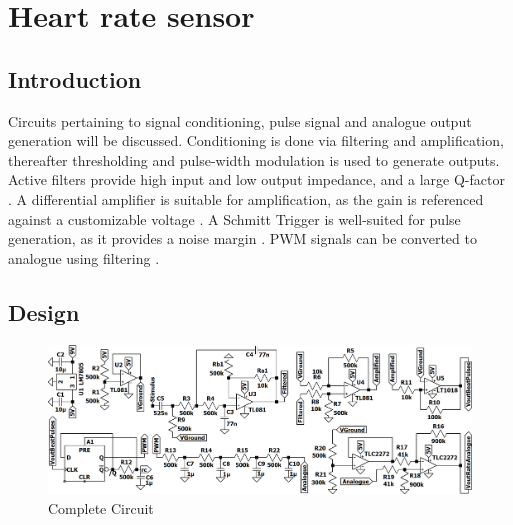 \chapter{Heart rate sensor}\label{ch:heartRate}

\section{Introduction} \label{sec:heartIntro}
Circuits pertaining to signal conditioning, pulse signal and analogue output generation will be discussed. Conditioning is done via filtering and amplification, thereafter thresholding and pulse-width modulation is used to generate outputs. Active filters provide high input and low output impedance, and a large Q-factor \cite{actpas}. A differential amplifier is suitable for amplification, as the gain is referenced against a customizable voltage \cite{opamp}. A Schmitt Trigger is well-suited for pulse generation, as it provides a noise margin \cite{schmitt}. PWM signals can be converted to analogue using filtering \cite{PWM}.

\section{Design} \label{sec:heartDesign}
\begin{figure}[h]
    \centering
    \vspace{-0.7cm}
    \includegraphics[width = 1\textwidth]{Figures/circuit2}
    \caption{Complete Circuit}
    \label{fig:circuit}
\end{figure}

\vspace{-0.5cm}
